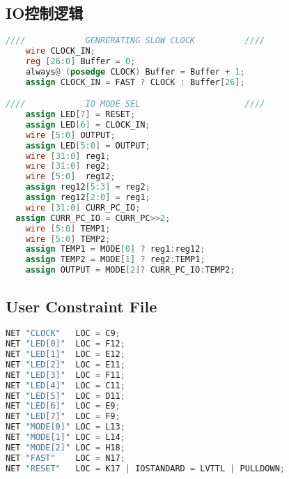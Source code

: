 \documentclass[a4paper]{article}
\begin{document}
    \subsection{IO控制逻辑}
    \begin{lstlisting}[language={Verilog},title={IO.v}]
////            GENRERATING SLOW CLOCK          ////
	wire CLOCK_IN;
	reg [26:0] Buffer = 0;
	always@ (posedge CLOCK) Buffer = Buffer + 1;
	assign CLOCK_IN = FAST ? CLOCK : Buffer[26];

////            IO MODE SEL                     ////
	assign LED[7] = RESET;
	assign LED[6] = CLOCK_IN;
	wire [5:0] OUTPUT;
	assign LED[5:0] = OUTPUT;
	wire [31:0] reg1;
	wire [31:0] reg2;
	wire [5:0]  reg12;
	assign reg12[5:3] = reg2;
	assign reg12[2:0] = reg1;
	wire [31:0] CURR_PC_IO;
  assign CURR_PC_IO = CURR_PC>>2;
	wire [5:0] TEMP1;
	wire [5:0] TEMP2;
	assign TEMP1 = MODE[0] ? reg1:reg12;
	assign TEMP2 = MODE[1] ? reg2:TEMP1;
	assign OUTPUT = MODE[2]? CURR_PC_IO:TEMP2;  \end{lstlisting}
    \subsection{User Constraint File}
    \begin{lstlisting}[language={Verilog},title={top.ucf}]
NET "CLOCK"   LOC = C9;
NET "LED[0]"  LOC = F12;
NET "LED[1]"  LOC = E12;
NET "LED[2]"  LOC = E11;
NET "LED[3]"  LOC = F11;
NET "LED[4]"  LOC = C11;
NET "LED[5]"  LOC = D11;
NET "LED[6]"  LOC = E9;
NET "LED[7]"  LOC = F9;
NET "MODE[0]" LOC = L13;
NET "MODE[1]" LOC = L14;
NET "MODE[2]" LOC = H18;
NET "FAST" 	  LOC = N17;
NET "RESET"   LOC = K17 | IOSTANDARD = LVTTL | PULLDOWN;  \end{lstlisting}
\end{document}

